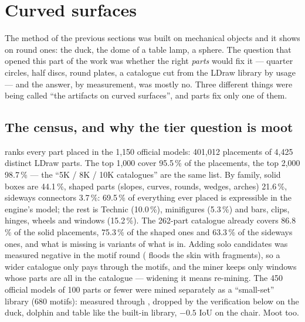 \section{Curved surfaces}\label{sec:curves}
The method of the previous sections was built on mechanical objects and it shows on round ones: the duck, the dome of a table
lamp, a sphere. The question that opened this part of the work was whether the right \emph{parts} would fix it --- quarter
circles, half discs, round plates, a catalogue cut from the LDraw library by usage --- and the answer, by measurement, was mostly
no. Three different things were being called ``the artifacts on curved surfaces'', and parts fix only one of them.

\subsection{The census, and why the tier question is moot}
 ranks every part placed in the 1,150 official models: 401,012 placements of 4,425 distinct
LDraw parts. The top 1,000 cover 95.5\,\% of the placements, the top 2,000 98.7\,\% --- the ``5K / 8K / 10K catalogues'' are
the same list. By family, solid boxes are 44.1\,\%, shaped parts (slopes, curves, rounds, wedges, arches) 21.6\,\%, sideways
connectors 3.7\,\%: 69.5\,\% of everything ever placed is expressible in the engine's model; the rest is Technic (10.0\,\%),
minifigures (5.3\,\%) and bars, clips, hinges, wheels and windows (15.2\,\%). The 262-part catalogue already covers 86.8\,\% of
the solid placements, 75.3\,\% of the shaped ones and 63.3\,\% of the sideways ones, and what is missing is variants of what is
in. Adding solo candidates was measured negative in the motif round ( floods the skin with fragments), so a
wider catalogue only pays through the motifs, and the miner keeps only windows whose parts are all in the catalogue --- widening it
means re-mining. The 450 official models of 100 parts or fewer were mined separately as a ``small-set'' library (680 motifs):
measured through , dropped by the verification below on the duck, dolphin and table like the built-in library,
$-0.5$ IoU on the chair. Moot too.


